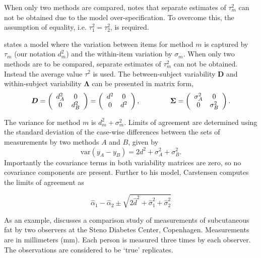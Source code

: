 \documentclass[12pt, a4paper]{report}
\theoremstyle{plain}
\theoremstyle{definition}
\theoremstyle{remark}
\begin{document}
	When only two methods are compared, \citet{BXC2008} notes that separate estimates of $\tau^2_m$ can not be obtained due to the model over-specification. To overcome this, the assumption of equality, i.e. $\tau^2_1 = \tau^2_2$, is required.
	
	
	\citet{BXC2008} states a model where the variation between items for method $m$ is captured by $\tau_m$ (our notation $d^2_m$) and the within-item variation by $\sigma_m$. When only two methods are to be compared, separate estimates of $\tau^2_m$ can not be obtained. Instead the average value $\tau^2$ is used. The between-subject variability $\boldsymbol{D}$ and within-subject variability $\boldsymbol{\Lambda}$ can be presented in matrix form,\[
	\boldsymbol{D} = \left(%
	\begin{array}{cc}
	d^2_{A}& 0 \\
	0 & d^2_{B} \\
	\end{array}%
	\right)=\left(%
	\begin{array}{cc}
	d^2& 0 \\
	0 & d^2\\
	\end{array}%
	\right),
	\hspace{1.5cm}
	\boldsymbol{\Sigma} = \left(%
	\begin{array}{cc}
	\sigma^2_{A}& 0 \\
	0 & \sigma^2_{B} \\
	\end{array}%
	\right).
	\]
	
	The variance for method $m$ is $d^2_{m}+\sigma^2_{m}$. Limits of agreement are determined using the standard deviation of the case-wise differences between the sets of measurements by two methods $A$ and $B$, given by
	\begin{equation}
	\mbox{var} (y_{A}-y_{B}) = 2d^2 + \sigma^2_{A}+ \sigma^2_{B}.
	\end{equation}
	Importantly the covariance terms in both variability matrices are zero, so no covariance components are present. Further to his model, Carstensen computes the limits of agreement
	as
	
	\[
	\hat{\alpha}_1 - \hat{\alpha}_2 \pm \sqrt{2 \hat{d}^2 + 	\hat{\sigma}^2_1 + \hat{\sigma}^2_2}
	\]
	
	
	
	As an example, \citet{BXC2008} discusses a comparison study of measurements of subcutaneous fat
	by two observers at the Steno Diabetes Center, Copenhagen. Measurements are in millimeters
	(mm). Each person is measured three times by each observer. The observations are considered to be `true' replicates.
	
\end{document}
